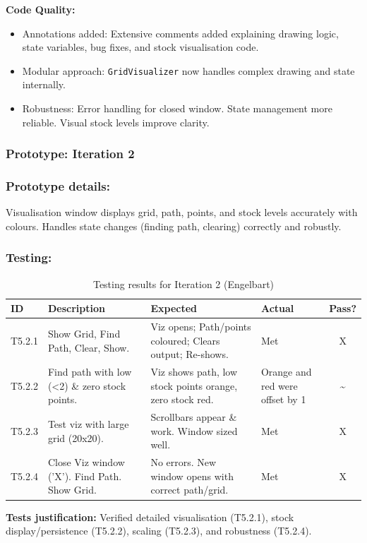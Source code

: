 \textbf{Code Quality:}
\begin{itemize}
	\item Annotations added: Extensive comments added explaining drawing logic, state variables, bug fixes, and stock visualisation code.
	\item Modular approach: \verb|GridVisualizer| now handles complex drawing and state internally.
	\item Robustness: Error handling for closed window. State management more reliable. Visual stock levels improve clarity.
\end{itemize}

\newpage
\subsubsection*{Prototype: Iteration 2}




\subsubsection{Prototype details:}
Visualisation window displays grid, path, points, and stock levels accurately with colours. Handles state changes (finding path, clearing) correctly and robustly.

\subsubsection{Testing:}
\begin{table}[htbp]
	\centering
	\begin{tabularx}{\textwidth}{|l|X|p{4.5cm}|p{1.5cm}|c|}
		\hline
		\textbf{ID} & \textbf{Description} & \textbf{Expected} & \textbf{Actual} & \textbf{Pass?} \\
		\hline
		T5.2.1 & Show Grid, Find Path, Clear, Show. & Viz opens; Path/points coloured; Clears output; Re-shows. & Met & X \\
		\hline
		T5.2.2 & Find path with low (<2) \& zero stock points. & Viz shows path, low stock points orange, zero stock red. & Orange and red were offset by 1 & \~{} \\
		\hline
		T5.2.3 & Test viz with large grid (20x20). & Scrollbars appear \& work. Window sized well. & Met & X \\
		\hline
		T5.2.4 & Close Viz window ('X'). Find Path. Show Grid. & No errors. New window opens with correct path/grid. & Met & X \\
		\hline
	\end{tabularx}
	\caption{Testing results for Iteration 2 (Engelbart)}
\end{table}
\textbf{Tests justification:} Verified detailed visualisation (T5.2.1), stock display/persistence (T5.2.2), scaling (T5.2.3), and robustness (T5.2.4).

